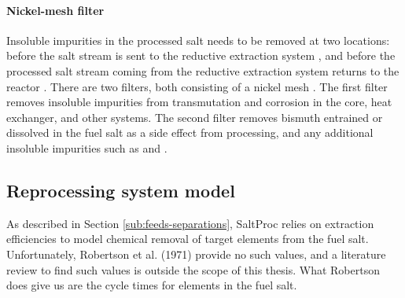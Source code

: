 \paragraph{Nickel-mesh filter}
Insoluble impurities in the processed salt needs to be removed at two locations:
before the salt stream is sent to the reductive extraction system
\cite{lindauer_design_1969}, and before the processed salt stream coming
from the reductive extraction system returns to the
reactor \cite{robertson_conceptual_1971}. There are two filters, both
consisting of a nickel mesh \cite{robertson_conceptual_1971}.
The first filter removes insoluble impurities from transmutation and corrosion in the core, heat exchanger, and
other systems. The second filter removes  bismuth entrained or dissolved in the
fuel salt as a side effect from processing, and any additional insoluble
impurities such as  and . 

\subsection{Reprocessing system model}
\label{sub:reprocessing-system-model}
As described in Section \ref{sub:feeds-separations}, SaltProc relies on extraction efficiencies to model chemical removal of target elements from the fuel salt.  Unfortunately, Robertson et al. (1971) 
\cite{robertson_conceptual_1971} provide no such values, and a literature review
to find such values is outside the scope of this thesis. What Robertson does
give us are the cycle times for elements in the fuel salt.

